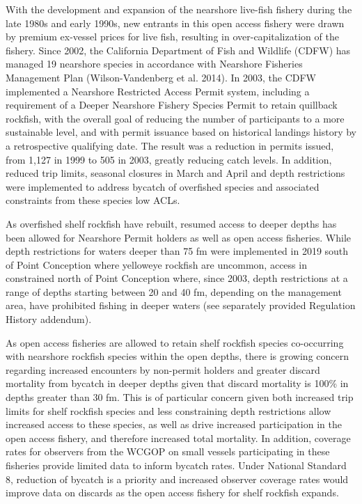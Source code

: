 \documentclass[11pt,
  english,
  letterpaper,
]{article}
\begin{document}
With the development and expansion of the nearshore live-fish fishery during the late 1980s and early 1990s, new entrants in this open access fishery were drawn by premium ex-vessel prices for live fish, resulting in over-capitalization of the fishery. Since 2002, the California Department of Fish and Wildlife (CDFW) has managed 19 nearshore species in accordance with Nearshore Fisheries Management Plan {(Wilson-Vandenberg et al. 2014)\leavevmode\tagmcend\tagstructend}. In 2003, the CDFW implemented a Nearshore Restricted Access Permit system, including a requirement of a Deeper Nearshore Fishery Species Permit to retain quillback rockfish, with the overall goal of reducing the number of participants to a more sustainable level, and with permit issuance based on historical landings history by a retrospective qualifying date. The result was a reduction in permits issued, from 1,127 in 1999 to 505 in 2003, greatly reducing catch levels. In addition, reduced trip limits, seasonal closures in March and April and depth restrictions were implemented to address bycatch of overfished species and associated constraints from these species low ACLs.

\leavevmode\tagmcend\tagstructend\par


As overfished shelf rockfish have rebuilt, resumed access to deeper depths has been allowed for Nearshore Permit holders as well as open access fisheries. While depth restrictions for waters deeper than 75 fm were implemented in 2019 south of Point Conception where yelloweye rockfish are uncommon, access in constrained north of Point Conception where, since 2003, depth restrictions at a range of depths starting between 20 and 40 fm, depending on the management area, have prohibited fishing in deeper waters (see separately provided Regulation History addendum).

\leavevmode\tagmcend\tagstructend\par


As open access fisheries are allowed to retain shelf rockfish species co-occurring with nearshore rockfish species within the open depths, there is growing concern regarding increased encounters by non-permit holders and greater discard mortality from bycatch in deeper depths given that discard mortality is 100\% in depths greater than 30 fm. This is of particular concern given both increased trip limits for shelf rockfish species and less constraining depth restrictions allow increased access to these species, as well as drive increased participation in the open access fishery, and therefore increased total mortality. In addition, coverage rates for observers from the WCGOP on small vessels participating in these fisheries provide limited data to inform bycatch rates. Under National Standard 8, reduction of bycatch is a priority and increased observer coverage rates would improve data on discards as the open access fishery for shelf rockfish expands.
\end{document}
